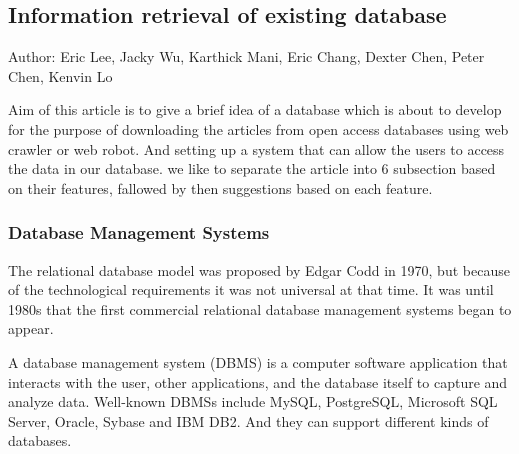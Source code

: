 	
\subsection{Information retrieval of existing database}
Author: Eric Lee, Jacky Wu, Karthick Mani, Eric Chang, Dexter Chen, Peter Chen, Kenvin Lo

Aim of this article is to give a brief idea of a database which is about to develop for the purpose of downloading the articles from open access databases using web crawler or web robot. And setting up a system that can allow the users to access the data in our database. we like to separate the article into 6 subsection based on their features, fallowed by then suggestions based on each feature. 


\subsubsection*{Database Management Systems}

The relational database model was proposed by Edgar Codd in 1970, but because of the technological requirements it was not universal at that time. It was until 1980s that the first commercial relational database management systems began to appear.

A database management system (DBMS) is a computer software application that interacts with the user, other applications, and the database itself to capture and analyze data. Well-known DBMSs include MySQL, PostgreSQL, Microsoft SQL Server, Oracle, Sybase and IBM DB2. And they can support different kinds of databases.

